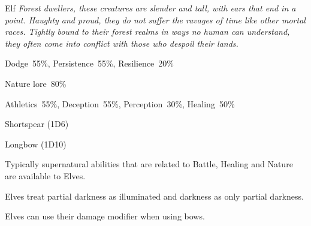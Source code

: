 \begin{monsterbox}{Elf}
	\textit{Forest dwellers, these creatures are slender and tall, with ears that end in a point. Haughty and proud, they do not suffer the ravages of time like other mortal races. Tightly bound to their forest realms in ways no human can understand, they often come into conflict with those who despoil their lands.}\\
	\rpghline
	\basics[%
        hitpoints  = 11, 
	majorwound = 6,
	damagemodifier = 0,
	powerpoints = 13,
	movementrate = 15m,
	armor = Leather (2AP),
	plunderrating = 1
	]
	\rpghline%
	\stats[ %
		STR = 2D6+3 (10),
		CON = 3D6   (11),
		DEX = 3D6+6 (17),
		SIZ = 2D6+3 (10),
		INT = 3D6+6 (17),
		POW = 2D6+6 (13),
		CHA = 3D6   (11)
	]
	\rpghline%
	\begin{rpg-monsteraction}[Resistances]
		Dodge~55\%, Persistence~55\%, Resilience~20\%
	\end{rpg-monsteraction}
	\begin{rpg-monsteraction}[Knowledge]
    		Nature lore~80\%
	\end{rpg-monsteraction}
	\begin{rpg-monsteraction}[Practical]
		Athletics~55\%, Deception~55\%, Perception~30\%, Healing~50\%
	\end{rpg-monsteraction}
	\begin{rpg-monsteraction}
		Shortspear (1D6)
	\end{rpg-monsteraction}
	\begin{rpg-monsteraction}
		Longbow (1D10)
	\end{rpg-monsteraction}
	\begin{rpg-monsteraction}[Supernatural]
		Typically supernatural abilities that are related to Battle, Healing and Nature are available to Elves.
	\end{rpg-monsteraction}
	\begin{rpg-monsteraction}
		Elves treat partial darkness as illuminated and darkness as only partial darkness.
	\end{rpg-monsteraction}
	\begin{rpg-monsteraction}
		Elves can use their damage modifier when using bows.
	\end{rpg-monsteraction}

\end{monsterbox}

